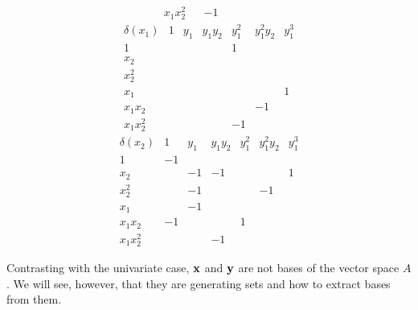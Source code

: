 \documentclass{standalone}
\begin{document}
\begin{exmp}
$$\begin{array}{c|cccccc}
	x_1x_2^2 &  & -1 &  &  &  &
\end{array}$$
$$\begin{array}{c|cccccc}
	\delta(x_1) & 1 & y_1 & y_1y_2 & y_1^2 & y_1^2y_2 & y_1^3 \\
	\hline
	1 &  &  &  & 1 &  & \\
	x_2 &  &  &  &  &  & \\
	x_2^2 &  &  &  &  &  & \\
	x_1 &  &  &  &  &  & 1\\
	x_1x_2 &  &  &  &  & -1 & \\
	x_1x_2^2 &  &  &  & -1 &  &
\end{array}$$
$$\begin{array}{c|cccccc}
	\delta(x_2) & 1 & y_1 & y_1y_2 & y_1^2 & y_1^2y_2 & y_1^3 \\
	\hline
	1 & -1 &  &  &  &  & \\
	x_2 &  & -1 & -1 &  &  & 1\\
	x_2^2 &  & -1 &  &  & -1 & \\
	x_1 &  & -1 &  &  &  & \\
	x_1x_2 & -1 &  &  & 1 &  & \\
	x_1x_2^2 &  &  & -1 &  &  &
\end{array}$$

\end{exmp}

\begin{rem}
Contrasting with the univariate case, $\bold{x}$ and $\bold{y}$ are not bases of the vector space $A$. We will see, however, that they are generating sets and how to extract bases from them.
\end{rem}
\end{document}
